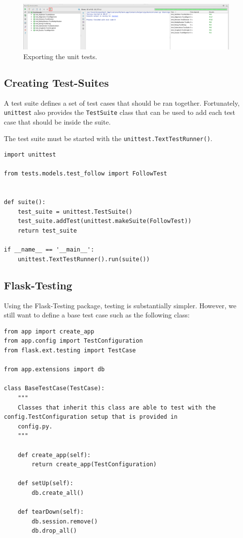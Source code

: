 \documentclass[../main/main.tex]{subfiles}
\begin{document}
\begin{figure}[H]
  \centering
  \includegraphics[width=0.8\linewidth]{../figures/export.png}
  \caption{Exporting the unit tests.}
  \label{fig:export}
\end{figure}

\subsection{Creating Test-Suites}

A test suite defines a set of test cases that should be ran together.
Fortunately, \lstinline|unittest| also provides the \lstinline|TestSuite| class
that can be used to add each test case that should be inside the suite. 

The test suite must be started with the \lstinline|unittest.TextTestRunner()|. 

\begin{lstlisting}
import unittest

from tests.models.test_follow import FollowTest


def suite():
    test_suite = unittest.TestSuite()
    test_suite.addTest(unittest.makeSuite(FollowTest))
    return test_suite

if __name__ == '__main__':
    unittest.TextTestRunner().run(suite())
\end{lstlisting}

\subsection{Flask-Testing}

Using the Flask-Testing package, testing is substantially simpler. However, we
still want to define a base test case such as the following class:

\begin{lstlisting}
from app import create_app
from app.config import TestConfiguration
from flask.ext.testing import TestCase

from app.extensions import db

class BaseTestCase(TestCase):
    """
    Classes that inherit this class are able to test with the config.TestConfiguration setup that is provided in
    config.py.
    """

    def create_app(self):
        return create_app(TestConfiguration)

    def setUp(self):
        db.create_all()

    def tearDown(self):
        db.session.remove()
        db.drop_all()
\end{lstlisting}
\end{document}
